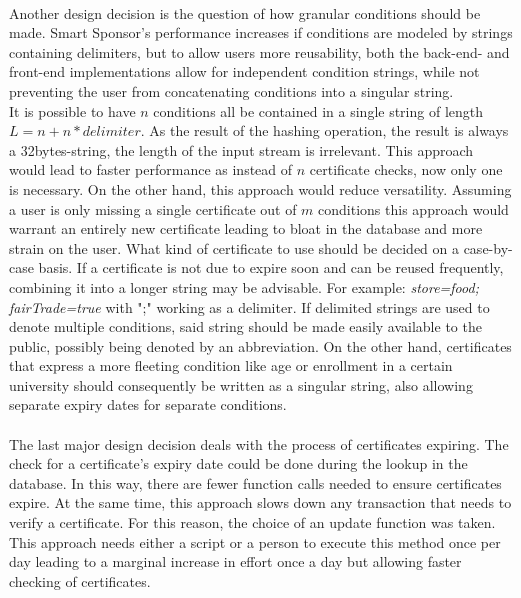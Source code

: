 \\
Another design decision is the question of how granular conditions should be made.
Smart Sponsor's performance increases if conditions are modeled by strings containing delimiters, but to allow users more reusability, both the back-end- and front-end implementations allow for independent condition strings, while not preventing the user from concatenating conditions into a singular string. \\
It is possible to have $n$ conditions all be contained in a single string of length $L = n + n*delimiter$. As the result of the hashing operation, the result is always a 32bytes-string, the length of the input stream is irrelevant. This approach would lead to faster performance as instead of $n$ certificate checks, now only one is necessary. On the other hand, this approach would reduce versatility. Assuming a user is only missing a single certificate out of $m$ conditions this approach would warrant an entirely new certificate leading to bloat in the database and more strain on the user. What kind of certificate to use should be decided on a case-by-case basis. If a certificate is not due to expire soon and can be reused frequently, combining it into a longer string may be advisable. For example: \emph{store=food; fairTrade=true} with ";" working as a delimiter. If delimited strings are used to denote multiple conditions, said string should be made easily available to the public, possibly being denoted by an abbreviation. On the other hand, certificates that express a more fleeting condition like age or enrollment in a certain university should consequently be written as a singular string, also allowing separate expiry dates for separate conditions.\\
\\
The last major design decision deals with the process of certificates expiring. The check for a certificate's expiry date could be done during the lookup in the database. In this way, there are fewer function calls needed to ensure certificates expire. At the same time, this approach slows down any transaction that needs to verify a certificate. For this reason, the choice of an update function was taken. This approach needs either a script or a person to execute this method once per day leading to a marginal increase in effort once a day but allowing faster checking of certificates.